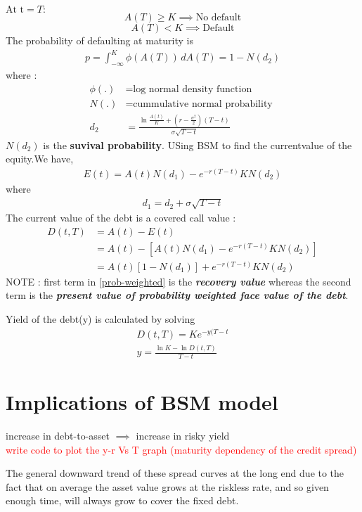 $\text{At t}=T :$ 
\[ A(T) \geq K \implies \text{No default} \]
\[ A(T) < K \implies \text{Default} \]
The probability of defaulting at maturity is 
\begin{align}
    p = \int_{-\infty}^K \phi(A(T)) \, dA(T)=1-N(d_2) \label{eq:defaultProbability}
\end{align}
where :\begin{align*}
\phi(.) &= \text{log normal density function} \\
N(.) &= \text{cummulative normal probability } \\
d_2 &= \frac{\ln{\frac{A(t)}{K}}+(r-\frac{\sigma^2}{2})(T-t)}{\sigma\sqrt{T-t}}
\end{align*}
$N(d_2)$ is the \textbf{suvival probability}. 
USing BSM to find the currentvalue of the equity.We have,
\begin{align}
    E(t)=A(t)N(d_1)-e^{-r(T-t)}KN(d_2)
\end{align}
where \begin{align*}
    d_1 = d_2+\sigma\sqrt{T-t}
\end{align*}
The current value of the debt is a covered call value : 
\begin{align}
    D(t,T)&=A(t)-E(t) \\
    &=A(t)-[A(t)N(d_1)-e^{-r(T-t)}KN(d_2)] \\
    &=A(t)[1-N(d_1)]+e^{-r(T-t)}KN(d_2) \label{prob-weighted}
\end{align}
NOTE : first term in \ref{prob-weighted} is the \textbf{\textit{recovery value}} whereas the second term is the \textbf{\textit{present value of probability weighted face value of the debt}}.
\par Yield of the debt(y) is calculated by solving 
\begin{align}
    D(t,T)=Ke^{-y(T-t} \\
    y = \frac{\ln{K}-\ln{D(t,T)}}{T-t}
\end{align}

\section{Implications of BSM model}
increase in debt-to-asset $\implies$ increase in risky yield \\
\textcolor{red}{write code to plot the y-r Vs T graph (maturity dependency of the credit spread)}\\
\par The general downward trend of these spread curves at the long end due to the fact that on average the asset value grows at the riskless rate, and so given enough time, will always grow to cover the fixed debt.

